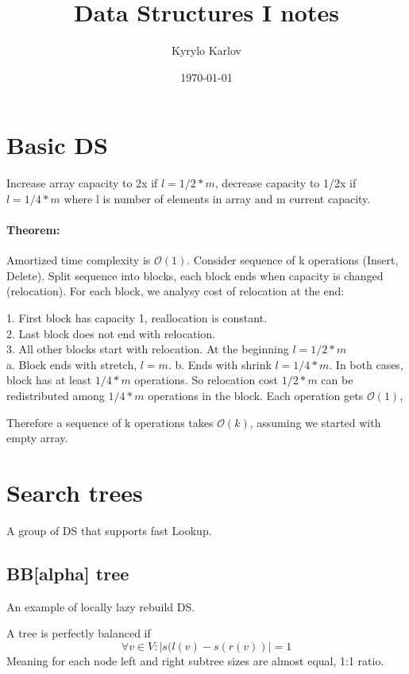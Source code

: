 \documentclass[12pt]{article}
\title {Data Structures I notes}
\author {Kyrylo Karlov}
\date {\today}
\newcommand{\bigO}{\mathcal{O}}
\begin{document}
\maketitle
\tableofcontents

\pagebreak

\section{Basic DS}

Increase array capacity to 2x if $l = 1/2 * m$, decrease capacity to 1/2x if $l = 1/4 * m$ where l is number of elements in array and m current capacity.

\paragraph{Theorem:} Amortized time complexity is $\bigO(1)$.
Consider sequence of k operations (Insert, Delete). Split sequence into blocks, each block ends when capacity is changed (relocation).
For each block, we analysy cost of relocation at the end:

1. First block has capacity 1, reallocation is constant. \\
2. Last block does not end with relocation. \\
3. All other blocks start with relocation. At the beginning $l = 1/2 * m$ \\
	a. Block ends with stretch, $l = m$.
	b. Ends with shrink $l = 1/4 * m$.
In both cases, block has at least $1/4 * m$ operations. So relocation cost $1/2 * m$ can be redistributed among $1/4 * m$ operations in the block.
Each operation gets $\bigO(1)$,

Therefore a sequence of k operations takes $\bigO(k)$, assuming we started with empty array.

\section{Search trees}
A group of DS that supports fast Lookup.


\subsection{BB[alpha] tree}
An example of locally lazy rebuild DS.

A tree is perfectly balanced if
\[ \forall v \in V : | s(l(v) - s(r(v)) | = 1 \]
Meaning for each node left and right subtree sizes are almost equal, 1:1 ratio.
\end{document}
